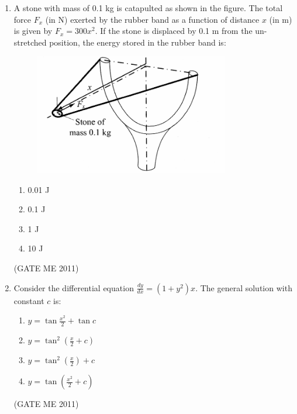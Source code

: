 \documentclass[journal]{IEEEtran}
\begin{document}
\begin{enumerate}
\begin{multicols}{4}
\begin{enumerate}
\item 3  
\item $ \frac{3}{2} $  
\item 1  
\item $ \frac{2}{3} $  
\end{enumerate}
\end{multicols}  
\hfill (GATE ME 2011)

\item A stone with mass of 0.1 kg is catapulted as shown in the figure. The total force $ F_x $ (in N) exerted by the rubber band as a function of distance $ x $ (in m) is given by $ F_x = 300x^2 $. If the stone is displaced by 0.1 m from the un-stretched position, the energy stored in the rubber band is:

\begin{figure}[H]
    \centering
    \includegraphics[width=0.8\textwidth]{Fig 7.png}
    \caption{}
    \label{fig:question32}
\end{figure}

\begin{multicols}{4}
\begin{enumerate}
\item 0.01 J  
\item 0.1 J  
\item 1 J  
\item 10 J  
\end{enumerate}
\end{multicols}   
\hfill (GATE ME 2011)

\item Consider the differential equation $ \frac{dy}{dx} = (1 + y^2)x $. The general solution with constant $ c $ is:
\begin{multicols}{2}
\begin{enumerate}
\item $ y = \tan \frac{x^2}{2} + \tan c $
\item $ y = \tan^2\left( \frac{x}{2} + c \right) $  
\item $ y = \tan^2( \frac{x}{2}) + c  $  
\item $ y = \tan\left(\frac{x^2}{2} + c \right) $  
\end{enumerate}
\end{multicols}   
\hfill (GATE ME 2011)


\end{enumerate}
\end{document}
